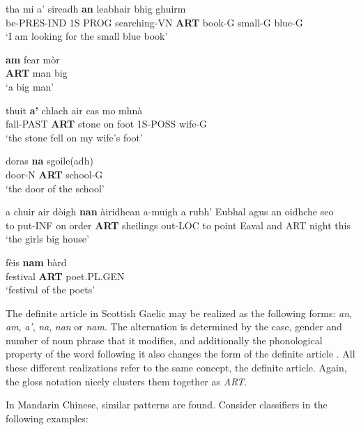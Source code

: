 \documentclass[final]{ua-thesis}
\numberwithin{equation}{section}
\begin{document}
\begin{exe}  
\ex 
\gll tha mi a' sireadh \textbf{an} leabhair bhig ghuirm\\
be-PRES-IND 1S PROG searching-VN \textbf{ART} book-G small-G blue-G\\
\glt `I am looking for the small blue book' \citep[p. 29]{lamb2001scottish}

\ex 
\gll \textbf{am} fear m\`or\\
\textbf{ART} man big\\
\glt `a big man' \citep[p. 31]{lamb2001scottish}

\ex
\gll thuit \textbf{a'} chlach air cas mo mhn\`a\\
fall-PAST \textbf{ART} stone on foot 1S-POSS wife-G\\
\glt`the stone fell on my wife's foot' \citep[p. 30]{lamb2001scottish} 	

\ex
\gll doras \textbf{na} sgoile(adh) \\
door-N \textbf{ART} school-G \\
\glt `the door of the school' \citep[p. 29]{lamb2001scottish} 	

\ex 
\gll a chuir air d\`oigh \textbf{nan} \`airidhean a-muigh a rubh' Eubhal agus an oidhche seo \\
to put-INF on order \textbf{ART} sheilings out-LOC to point Eaval and ART night this \\
\glt `the girls big house' \citep[p. 100]{lamb2001scottish} 

\ex
\gll f\`eis \textbf{nam} b\`ard\\
festival \textbf{ART} poet.PL.GEN\\
\glt `festival of the poets' \citep[p. 107]{lamb2001scottish}

\end{exe}

The definite article in Scottish Gaelic may be realized as the following forms: \textit{an}, \textit{am}, \textit{a'}, \textit{na}, \textit{nan} or \textit{nam}. The alternation is determined by the case, gender and number of noun phrase that it modifies, and additionally the phonological property of the word following it also changes the form of the definite article \citep{lamb2001scottish}. All these different realizations refer to the same concept, the definite article. Again, the gloss notation nicely clusters them together as \textit{ART}. 

In Mandarin Chinese, similar patterns are found. Consider classifiers in the following examples:
\end{document}
